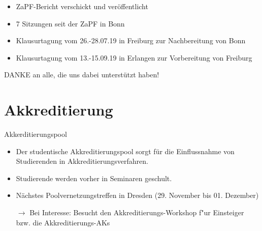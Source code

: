 \documentclass[compress, aspectratio=169]{beamer}
\begin{document}
\begin{frame}
  \begin{itemize}
    \item ZaPF-Bericht verschickt und veröffentlicht
    \item 7 Sitzungen seit der ZaPF in Bonn
    \item Klausurtagung vom 26.-28.07.19 in Freiburg zur Nachbereitung von Bonn
    \item Klausurtagung vom 13.-15.09.19 in Erlangen zur Vorbereitung von Freiburg
    \end{itemize}
    \vspace{5mm}
    \begin{center}
      \Large DANKE an alle, die uns dabei unterstützt haben!
    \end{center}
\end{frame}




\section{Akkreditierung}

\begin{frame}{Akkerditierungspool}
    \begin{itemize}
        \item Der studentische Akkreditierungspool sorgt für die Einflussnahme von Studierenden in Akkreditierungsverfahren.
        \item Studierende werden vorher in Seminaren geschult.
        \item Nächstes Poolvernetzungstreffen in Dresden (29. November bis 01. Dezember)
        \vspace{0.5cm}
        \item[$\rightarrow$] Bei Interesse: Besucht den Akkreditierungs-Workshop f"ur Einsteiger bzw. die Akkreditierungs-AKs
    \end{itemize}
\end{frame}
\end{document}
